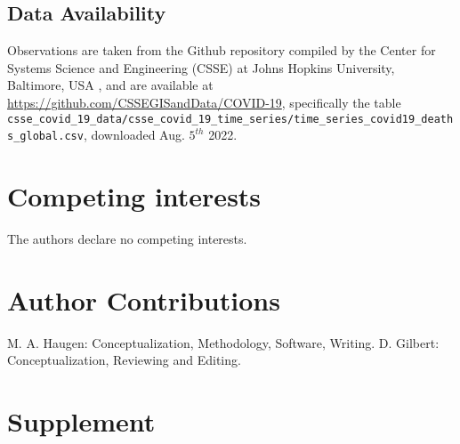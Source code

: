 \documentclass{article}
\begin{document}
\subsection*{Data Availability}
Observations are taken from the Github repository compiled by the Center for Systems Science and Engineering (CSSE) at Johns Hopkins University, Baltimore,
USA \cite{dong2020interactive}, and are available at \url{https://github.com/CSSEGISandData/COVID-19}, specifically the table \newline\verb|csse_covid_19_data/csse_covid_19_time_series/time_series_covid19_deaths_global.csv|, \newline downloaded Aug. $5^{th}$ 2022.

\section*{Competing interests}
The authors declare no competing interests.

\section*{Author Contributions}
M. A. Haugen: Conceptualization, Methodology, Software, Writing. D. Gilbert: Conceptualization, Reviewing and Editing.

\section*{Supplement}

\end{document}

